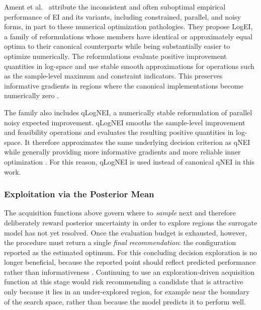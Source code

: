 Ament et al.~\cite{ament2023unexpected} attribute the inconsistent and often suboptimal empirical performance of EI and its variants, including constrained, parallel, and noisy forms, in part to these numerical optimization pathologies. They propose LogEI, a family of reformulations whose members have identical or approximately equal optima to their canonical counterparts while being substantially easier to optimize numerically. The reformulations evaluate positive improvement quantities in log-space and use stable smooth approximations for operations such as the sample-level maximum and constraint indicators. This preserves informative gradients in regions where the canonical implementations become numerically zero \cite{ament2023unexpected}.

The family also includes qLogNEI, a numerically stable reformulation of parallel noisy expected improvement. qLogNEI smooths the sample-level improvement and feasibility operations and evaluates the resulting positive quantities in log-space. It therefore approximates the same underlying decision criterion as qNEI while generally providing more informative gradients and more reliable inner optimization \cite{ament2023unexpected}. For this reason, qLogNEI is used instead of canonical qNEI in this work.

\subsubsection{Exploitation via the Posterior Mean}
The acquisition functions above govern where to \emph{sample} next and therefore deliberately reward posterior uncertainty in order to explore regions the surrogate model has not yet resolved. Once the evaluation budget is exhausted, however, the procedure must return a single \emph{final recommendation}: the configuration reported as the estimated optimum. For this concluding decision exploration is no longer beneficial, because the reported point should reflect predicted performance rather than informativeness \cite{shahriari2015taking}. Continuing to use an exploration-driven acquisition function at this stage would risk recommending a candidate that is attractive only because it lies in an under-explored region, for example near the boundary of the search space, rather than because the model predicts it to perform well.

